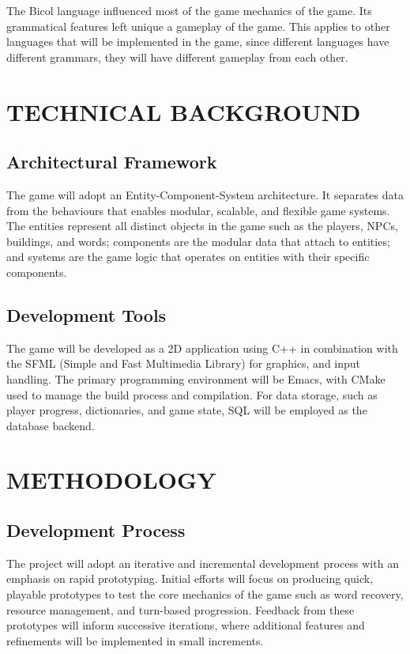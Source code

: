 \documentclass[11pt]{article}
\begin{document}
The Bicol language influenced most of the game mechanics of the game. Its grammatical features left unique a gameplay of the game. This applies to other languages that will be implemented in the game, since different languages have different grammars, they will have different gameplay from each other.

\section{TECHNICAL BACKGROUND}
\subsection{Architectural Framework}
The game will adopt an Entity-Component-System architecture. It separates data from the behaviours that enables modular, scalable, and flexible game systems. The entities represent all distinct objects in the game such as the players, NPCs, buildings, and words; components are the modular data that attach to entities; and systems are the game logic that operates on entities with their specific components.

\subsection{Development Tools}
The game will be developed as a 2D application using C++ in combination with the SFML (Simple and Fast Multimedia Library) for graphics, and input handling.  
The primary programming environment will be Emacs, with CMake used to manage the build process and compilation.  
For data storage, such as player progress, dictionaries, and game state, SQL will be employed as the database backend.


\section{METHODOLOGY}
\subsection{Development Process}
The project will adopt an iterative and incremental development process with an emphasis on rapid prototyping. 
Initial efforts will focus on producing quick, playable prototypes to test the core mechanics of the game such as word recovery, resource management, and turn-based progression. 
Feedback from these prototypes will inform successive iterations, where additional features and refinements will be implemented in small increments.\\
\end{document}

